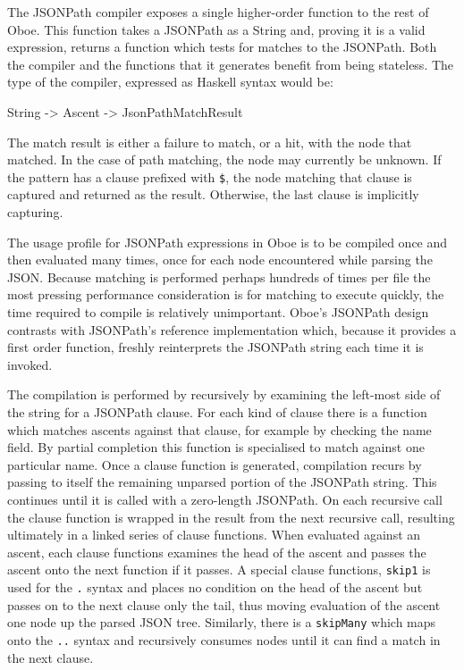 \documentclass[]{article}
\newenvironment{Shaded}{}{}
\newcommand{\DataTypeTok}[1]{\textcolor[rgb]{0.56,0.13,0.00}{{#1}}}
\newcommand{\OtherTok}[1]{\textcolor[rgb]{0.00,0.44,0.13}{{#1}}}
\begin{document}
The JSONPath compiler exposes a single higher-order function to the rest
of Oboe. This function takes a JSONPath as a String and, proving it is a
valid expression, returns a function which tests for matches to the
JSONPath. Both the compiler and the functions that it generates benefit
from being stateless. The type of the compiler, expressed as Haskell
syntax would be:

\begin{Shaded}
\begin{Highlighting}[]
\DataTypeTok{String} \OtherTok{->} \DataTypeTok{Ascent} \OtherTok{->} \DataTypeTok{JsonPathMatchResult}
\end{Highlighting}
\end{Shaded}

The match result is either a failure to match, or a hit, with the node
that matched. In the case of path matching, the node may currently be
unknown. If the pattern has a clause prefixed with \texttt{\$}, the node
matching that clause is captured and returned as the result. Otherwise,
the last clause is implicitly capturing.

The usage profile for JSONPath expressions in Oboe is to be compiled
once and then evaluated many times, once for each node encountered while
parsing the JSON. Because matching is performed perhaps hundreds of
times per file the most pressing performance consideration is for
matching to execute quickly, the time required to compile is relatively
unimportant. Oboe's JSONPath design contrasts with JSONPath's reference
implementation which, because it provides a first order function,
freshly reinterprets the JSONPath string each time it is invoked.

The compilation is performed by recursively by examining the left-most
side of the string for a JSONPath clause. For each kind of clause there
is a function which matches ascents against that clause, for example by
checking the name field. By partial completion this function is
specialised to match against one particular name. Once a clause function
is generated, compilation recurs by passing to itself the remaining
unparsed portion of the JSONPath string. This continues until it is
called with a zero-length JSONPath. On each recursive call the clause
function is wrapped in the result from the next recursive call,
resulting ultimately in a linked series of clause functions. When
evaluated against an ascent, each clause functions examines the head of
the ascent and passes the ascent onto the next function if it passes. A
special clause functions, \texttt{skip1} is used for the \texttt{.}
syntax and places no condition on the head of the ascent but passes on
to the next clause only the tail, thus moving evaluation of the ascent
one node up the parsed JSON tree. Similarly, there is a
\texttt{skipMany} which maps onto the \texttt{..} syntax and recursively
consumes nodes until it can find a match in the next clause.
\end{document}
